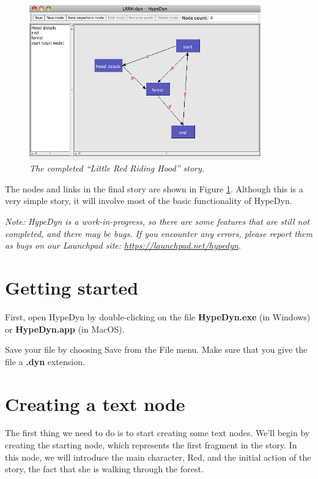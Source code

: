 \documentclass{article}
\begin{document}
\begin{figure}[ht]
  \centering
  \includegraphics[width=10cm]{images/hypedyn-tutorial-1-figure-1}
  \caption{\textit{The completed ``Little Red Riding Hood'' story.}}
  \label{fig:completed_story}
\end{figure} 

The nodes and links in the final story are shown in Figure
\ref{fig:completed_story}. Although this is a very simple story, it will involve
most of the basic functionality of HypeDyn.

\textit{Note:  HypeDyn is a work-in-progress, so there are some features that are still
not completed, and there may be bugs. If you encounter any errors, please
report them as bugs on our Launchpad site: \url{https://launchpad.net/hypedyn}.}

\section{Getting started}

First, open HypeDyn by double-clicking on the file \textbf{HypeDyn.exe} (in
Windows) or \textbf{HypeDyn.app} (in MacOS).

Save your file by choosing Save from the File menu. Make sure that you give the
file a \textbf{.dyn} extension.

\section{Creating a text node}

The first thing we need to do is to start creating some text nodes. We'll begin
by creating the starting node, which represents the first fragment in the story.
In this node, we will introduce the main character, Red, and the initial action of
the story, the fact that she is walking through the forest.
 
\end{document}
